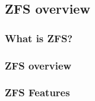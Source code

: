 \subsection{ZFS overview} %
\begin{frame}[fragile]
    \frametitle{What is ZFS?}
\end{frame}
% 
% 
% 
% 
% 
% 
% 
% 
% 
\begin{frame}[fragile]
    \frametitle{ZFS overview}
\end{frame}
% 
% 
\begin{frame}[fragile]
    \frametitle{ZFS Features}
\end{frame}
% 
